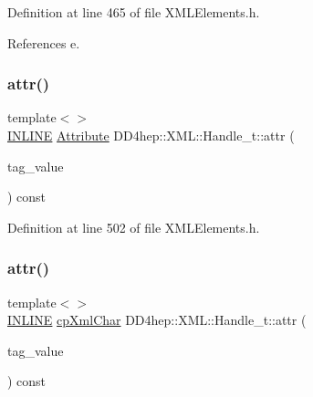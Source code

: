 Definition at line 465 of file X\+M\+L\+Elements.\+h.



References e.

\hypertarget{class_d_d4hep_1_1_x_m_l_1_1_handle__t_a0a4cc20ab59c7dbb8bdd8e48db3a712b}{}\label{class_d_d4hep_1_1_x_m_l_1_1_handle__t_a0a4cc20ab59c7dbb8bdd8e48db3a712b} 
\subsubsection{\texorpdfstring{attr()}{attr()}\hspace{0.1cm}{\footnotesize\ttfamily [4/10]}}
{\footnotesize\ttfamily template$<$$>$ \\
\hyperlink{_x_m_l_elements_8h_a2eb6f9e0395b47b8d5e3eeae4fe0c116}{I\+N\+L\+I\+NE} \hyperlink{namespace_d_d4hep_1_1_x_m_l_a5c19b7116be99d69b4b22d911357baaf}{Attribute} D\+D4hep\+::\+X\+M\+L\+::\+Handle\+\_\+t\+::attr (\begin{DoxyParamCaption}\item[{const \hyperlink{namespace_d_d4hep_1_1_x_m_l_a09e5d9cc86ed782f6826dfe0778c1815}{Xml\+Char} $\ast$}]{tag\+\_\+value }\end{DoxyParamCaption}) const}



Definition at line 502 of file X\+M\+L\+Elements.\+h.

\hypertarget{class_d_d4hep_1_1_x_m_l_1_1_handle__t_a25a34516c3c3d50d7a804864b9095076}{}\label{class_d_d4hep_1_1_x_m_l_1_1_handle__t_a25a34516c3c3d50d7a804864b9095076} 
\subsubsection{\texorpdfstring{attr()}{attr()}\hspace{0.1cm}{\footnotesize\ttfamily [5/10]}}
{\footnotesize\ttfamily template$<$$>$ \\
\hyperlink{_x_m_l_elements_8h_a2eb6f9e0395b47b8d5e3eeae4fe0c116}{I\+N\+L\+I\+NE} \hyperlink{namespace_d_d4hep_1_1_x_m_l_a55d8459973c11d7c20ba5a1d7ef1242c}{cp\+Xml\+Char} D\+D4hep\+::\+X\+M\+L\+::\+Handle\+\_\+t\+::attr (\begin{DoxyParamCaption}\item[{const \hyperlink{namespace_d_d4hep_1_1_x_m_l_a09e5d9cc86ed782f6826dfe0778c1815}{Xml\+Char} $\ast$}]{tag\+\_\+value }\end{DoxyParamCaption}) const}




